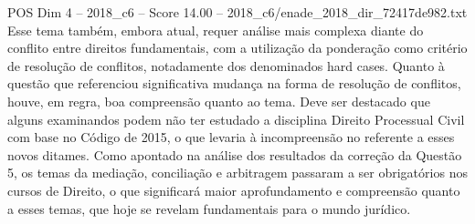 \begin{textsample}{POS Dim 4 – 2018\_c6 – Score 14.00 – 2018\_c6/enade\_2018\_dir\_72417de982.txt}
Esse tema também, embora atual, requer análise mais complexa diante do conflito entre direitos fundamentais, com a utilização da ponderação como critério de resolução de conflitos, notadamente dos denominados hard cases.
Quanto à questão que referenciou significativa mudança na forma de resolução de conflitos, houve, em regra, boa compreensão quanto ao tema.
Deve ser destacado que alguns examinandos podem não ter estudado a disciplina Direito Processual Civil com base no Código de 2015, o que levaria à incompreensão no referente a esses novos ditames.
Como apontado na análise dos resultados da correção da Questão 5, os temas da mediação, conciliação e arbitragem passaram a ser obrigatórios nos cursos de Direito, o que significará maior aprofundamento e compreensão quanto a esses temas, que hoje se revelam fundamentais para o mundo jurídico.

\end{textsample}
